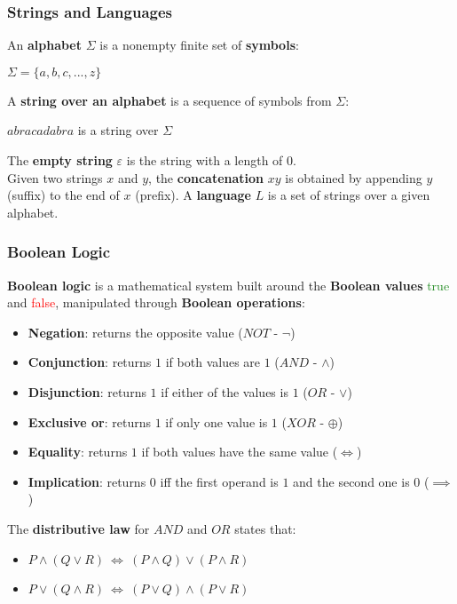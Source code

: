 \documentclass{article}
\begin{document}
\subsubsection{Strings and Languages}
An \textbf{alphabet} $\Sigma$ is a nonempty finite set of \textbf{symbols}:
\begin{center}
    $\Sigma = \{a,b,c,...,z\}$
\end{center}
A \textbf{string over an alphabet} is a sequence of symbols from $\Sigma$:
\begin{center}
    $abracadabra$ is a string over $\Sigma$
\end{center}
The \textbf{empty string} $\varepsilon$ is the string with a length of $0$. \\
Given two strings $x$ and $y$, the \textbf{concatenation} $xy$ is obtained by appending $y$ (suffix) to the end of $x$ (prefix).
A \textbf{language} $L$ is a set of strings over a given alphabet.
\subsubsection{Boolean Logic}
\textbf{Boolean logic} is a mathematical system built around the \textbf{Boolean values} \textcolor{ForestGreen}{true} and \textcolor{red}{false}, manipulated through \textbf{Boolean operations}:
\begin{itemize}
    \item \textbf{Negation}: returns the opposite value ($NOT$ - $\neg$)
    \item \textbf{Conjunction}: returns $1$ if both values are $1$ ($AND$ - $\land$)
    \item \textbf{Disjunction}: returns $1$ if either of the values is $1$ ($OR$ - $\lor$) 
    \item \textbf{Exclusive or}: returns $1$ if only one value is $1$ ($XOR$ - $\oplus$)
    \item \textbf{Equality}: returns $1$ if both values have the same value ($\iff$)
    \item \textbf{Implication}: returns $0$ iff the first operand is $1$ and the second one is $0$ ($\implies$)
\end{itemize}
The \textbf{distributive law} for $AND$ and $OR$ states that:
\begin{itemize}
    \item $P \land (Q \lor R) \ \iff \ (P \land Q) \lor (P \land R)$
    \item $P \lor (Q \land R) \ \iff \ (P \lor Q) \land (P \lor R)$
\end{itemize}
\end{document}
